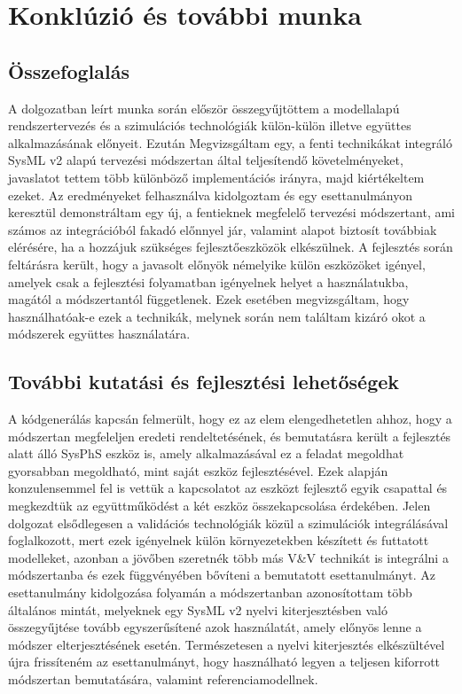 \chapter{Konklúzió és további munka}

\section{Összefoglalás}
A dolgozatban leírt munka során először összegyűjtöttem a modellalapú rendszertervezés és a szimulációs technológiák külön-külön illetve együttes alkalmazásának előnyeit.
Ezután Megvizsgáltam egy, a fenti technikákat integráló SysML v2 alapú tervezési módszertan által teljesítendő követelményeket, javaslatot tettem több különböző implementációs irányra, majd kiértékeltem ezeket.
Az eredményeket felhasználva kidolgoztam és egy esettanulmányon keresztül demonstráltam egy új, a fentieknek megfelelő tervezési módszertant, ami számos az integrációból fakadó előnnyel jár, valamint alapot biztosít továbbiak elérésére, ha a hozzájuk szükséges fejlesztőeszközök elkészülnek.
A fejlesztés során feltárásra került, hogy a javasolt előnyök némelyike külön eszközöket igényel, amelyek csak a fejlesztési folyamatban igényelnek helyet a használatukba, magától a módszertantól függetlenek.
Ezek esetében megvizsgáltam, hogy használhatóak-e ezek a technikák, melynek során nem találtam kizáró okot a módszerek együttes használatára.

\section{További kutatási és fejlesztési lehetőségek}
A kódgenerálás kapcsán felmerült, hogy ez az elem elengedhetetlen ahhoz, hogy a módszertan megfeleljen eredeti rendeltetésének, és bemutatásra került a fejlesztés alatt álló SysPhS eszköz is, amely alkalmazásával ez a feladat megoldhat gyorsabban megoldható, mint saját eszköz fejlesztésével.
Ezek alapján konzulensemmel fel is vettük a kapcsolatot az eszközt fejlesztő egyik csapattal és megkezdtük az együttműködést a két eszköz összekapcsolása érdekében.
Jelen dolgozat elsődlegesen a validációs technológiák közül a szimulációk integrálásával foglalkozott, mert ezek igényelnek külön környezetekben készített és futtatott modelleket, azonban a jövőben szeretnék több más V\&V technikát is integrálni a módszertanba és ezek függvényében bővíteni a bemutatott esettanulmányt.
Az esettanulmány kidolgozása folyamán a módszertanban azonosítottam több általános mintát, melyeknek egy SysML v2 nyelvi kiterjesztésben való összegyűjtése tovább egyszerűsítené azok használatát, amely előnyös lenne a módszer elterjesztésének esetén. Természetesen a nyelvi kiterjesztés elkészültével újra frissíteném az esettanulmányt, hogy használható legyen a teljesen kiforrott módszertan bemutatására, valamint referenciamodellnek.